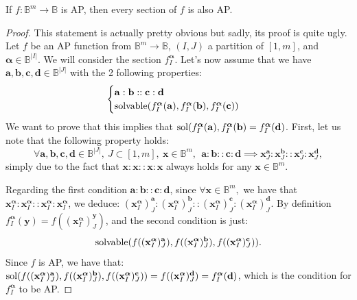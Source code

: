 \begin{property}\label{section_preserve_wap}
If $f\colon \mathbb{B}^m\to \mathbb{B}$ is AP, then every section of $f$ is
  also AP.
\end{property}
\begin{proof}
  This statement is actually pretty obvious but sadly, its proof is quite ugly.
  Let $f$ be an AP function from $\mathbb{B}^m \to \mathbb{B}$, $(I,J)$ a
  partition of $[1, m]$, and $\boldsymbol{\alpha} \in \mathbb{B}^{|I|}$. We
  will consider the section  $f^{\boldsymbol{\alpha}}_I$.  Let's now assume
  that we have $\mathbf{a},\mathbf{b},\mathbf{c}, \mathbf{d} \in
  \mathbb{B}^{|J|}$ with the 2 following properties:
  $$
  \begin{cases}
    \mathbf{a}:\mathbf{b}::\mathbf{c}:\mathbf{d}\\
    \text{solvable}(f^{\boldsymbol{\alpha}}_I(\mathbf{a}),
    f^{\boldsymbol{\alpha}}_I(\mathbf{b}),
    f^{\boldsymbol{\alpha}}_I(\mathbf{c}))
  \end{cases}
  $$
  We want to prove that this implies that
  $\text{sol}(f^{\boldsymbol{\alpha}}_I(\mathbf{a}),
  f^{\boldsymbol{\alpha}}_I(\mathbf{b}) =
  f^{\boldsymbol{\alpha}}_I(\mathbf{d})$.
  First, let us note that the following property holds:
$$\forall \mathbf{a},\mathbf{b},\mathbf{c}, \mathbf{d} \in \mathbb{B}^{|J|},~J
  \subset [1,m], ~ \mathbf{x} \in \mathbb{B}^m,~~ \mathbf{a}: \mathbf{b} ::
  \mathbf{c} : \mathbf{d} \implies \mathbf{x}^{\mathbf{a}}_J :
  \mathbf{x}^{\mathbf{b}}_J:: \mathbf{x}^{\mathbf{c}}_J :
  \mathbf{x}^{\mathbf{d}}_J,$$
  simply due to the fact that $\mathbf{x}:\mathbf{x}::\mathbf{x}:\mathbf{x}$
  always holds for any $\mathbf{x} \in \mathbb{B}^m$.

Regarding the first condition $\mathbf{a}:\mathbf{b}::\mathbf{c}:\mathbf{d}$,
since $\forall \mathbf{x} \in \mathbb{B}^m,$ we have that $
  \mathbf{x}^{\boldsymbol{\alpha}}_I : \mathbf{x}^{\boldsymbol{\alpha}}_I ::
  \mathbf{x}^{\boldsymbol{\alpha}}_I : \mathbf{x}^{\boldsymbol{\alpha}}_I$, we
  deduce: $(\mathbf{x}^{\boldsymbol{\alpha}}_I)^{\mathbf{a}}_J :
  (\mathbf{x}^{\boldsymbol{\alpha}}_I)^{\mathbf{b}}_J ::
  (\mathbf{x}^{\boldsymbol{\alpha}}_I)^{\mathbf{c}}_J :
  (\mathbf{x}^{\boldsymbol{\alpha}}_I)^{\mathbf{d}}_J$.
By definition $f^{\boldsymbol{\boldsymbol{\alpha}}}_I(\mathbf{y}) =
  f((\mathbf{x}^{\boldsymbol{\alpha}}_I)^{\mathbf{y}}_J)$, and the second
  condition is just:
  $$\text{solvable}(f((\mathbf{x}^{\boldsymbol{\alpha}}_I)^\mathbf{a}_J),
  f((\mathbf{x}^{\boldsymbol{\alpha}}_I)^\mathbf{b}_J),
  f((\mathbf{x}^{\boldsymbol{\alpha}}_I)^\mathbf{c}_J)).$$
  Since $f$ is AP, we have that:
  $\text{sol}(f((\mathbf{x}^{\boldsymbol{\alpha}}_I)^\mathbf{a}_J),
  f((\mathbf{x}^{\boldsymbol{\alpha}}_I)^\mathbf{b}_J),
  f((\mathbf{x}^{\boldsymbol{\alpha}}_I)^\mathbf{c}_J))=
  f((\mathbf{x}^{\boldsymbol{\alpha}}_I)^\mathbf{d}_J)=
  f^{\boldsymbol{\alpha}}_I(\mathbf{d})$,
  which is the condition for  $f^{\boldsymbol{\boldsymbol{\alpha}}}_I$ to be
  AP.
\end{proof}


